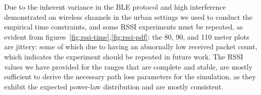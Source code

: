 Due to the inherent variance in the BLE protocol and high interference demonstrated on wireless channels in the urban settings we used to conduct the empirical time constraints, and some RSSI experiments must be repeated, as evident from figures~\ref{fig:rssi-time},\ref{fig:rssi-pdf}: the 80, 90, and 110 meter plots are jittery: some of which due to having an abnornally low received packet count, which indicates the experiment should be repeated in future work.
The RSSI values we have provided for the ranges that are complete and stable, are mostly sufficient to derive the necessary path loss parameters for the simulation, as they exhibit the expected power-law distribution and are mostly consistent.
